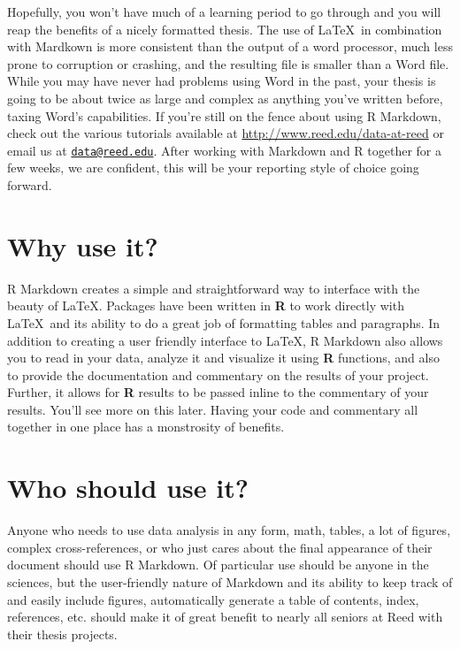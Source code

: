\documentclass[12pt,twoside]{reedthesis}
\begin{document}
  Hopefully, you won't have much of a learning period to go through and
  you will reap the benefits of a nicely formatted thesis. The use of
  \LaTeX~in combination with Mardkown is more consistent than the output
  of a word processor, much less prone to corruption or crashing, and the
  resulting file is smaller than a Word file. While you may have never had
  problems using Word in the past, your thesis is going to be about twice
  as large and complex as anything you've written before, taxing Word's
  capabilities. If you're still on the fence about using R Markdown, check
  out the various tutorials available at
  \url{http://www.reed.edu/data-at-reed} or email us at
  \href{mailto:data@reed.edu}{\nolinkurl{data@reed.edu}}. After working
  with Markdown and R together for a few weeks, we are confident, this
  will be your reporting style of choice going forward.
  
  \section{Why use it?}
  
  R Markdown creates a simple and straightforward way to interface with
  the beauty of \LaTeX. Packages have been written in \textbf{R} to work
  directly with \LaTeX~and its ability to do a great job of formatting
  tables and paragraphs. In addition to creating a user friendly interface
  to \LaTeX, R Markdown also allows you to read in your data, analyze it
  and visualize it using \textbf{R} functions, and also to provide the
  documentation and commentary on the results of your project. Further, it
  allows for \textbf{R} results to be passed inline to the commentary of
  your results. You'll see more on this later. Having your code and
  commentary all together in one place has a monstrosity of benefits.
  
  \section{Who should use it?}
  
  Anyone who needs to use data analysis in any form, math, tables, a lot
  of figures, complex cross-references, or who just cares about the final
  appearance of their document should use R Markdown. Of particular use
  should be anyone in the sciences, but the user-friendly nature of
  Markdown and its ability to keep track of and easily include figures,
  automatically generate a table of contents, index, references, etc.
  should make it of great benefit to nearly all seniors at Reed with their
  thesis projects.
  
\end{document}
